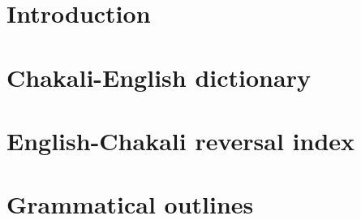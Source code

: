 \documentclass[output=book
	      ,modfonts
	      ,nonflat 
		]{langsci/langscibook}
\begin{document}
       
\maketitle          


 
 


\frontmatter
\tableofcontents    


 


\mainmatter    

\ohead{\headmark}
\part{Introduction}
   
\lohead{}
\rohead{} 
\ohead{}
\ihead{}
\chead{\rightmark\hfill\leftmark} 


{\sloppy 
\newpage
\part{Chakali-English dictionary}
 \label{part:part1}

\newcommand{\headrulewidth}{0pt}
\setlength{\columnsep}{3em}
\setlength{\parindent}{0pt}
 



\renewcommand{\lsgloss}[1]{\textbf{#1}\markboth{#1}{#1}}
\renewcommand{\definition}[1]{\textbf{#1}\markboth{#1}{#1}}
\renewcommand{\headword}[1]{{#1}}
\renewcommand{\homograph}[1]{\textsuperscript{#1}}
\renewcommand{\sensenr}[1]{\textsubscript{#1}}



\newpage
 \part{English-Chakali reversal index}
  \label{part:index}

   
}
\chead{}
\ohead{\headmark}
% 
 \newpage
 \part{Grammatical outlines}
 \label{part:gram-part}
\end{document}
